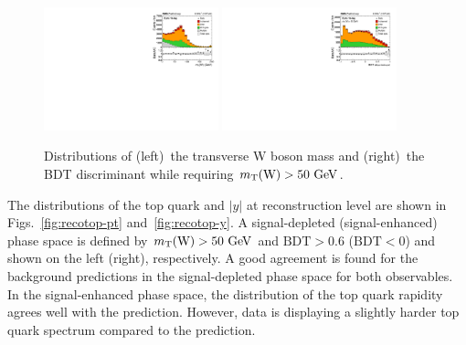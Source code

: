 \documentclass[12pt]{article}
\begin{document}
\begin{figure}[th]
\begin{center}
\includegraphics[width=0.45\textwidth]{figures/fit/reco_mtw.pdf}\hspace{0.05\textwidth}
\includegraphics[width=0.45\textwidth]{figures/fit/reco_BDT.pdf}
\end{center}

\caption{\label{fig:mtwbdt}Distributions of (left)~the transverse W boson mass and (right)~the BDT discriminant while requiring $m_{\mathrm{T}}(\mathrm{W})>50~\mathrm{GeV}$.}
\end{figure}

The distributions of the top quark \pt and $|y|$ at reconstruction level are shown in Figs.~\ref{fig:recotop-pt} and~\ref{fig:recotop-y}. A signal-depleted (signal-enhanced) phase space is defined by $m_{\mathrm{T}}(\mathrm{W})>50~\mathrm{GeV}$ and $\mathrm{BDT}>0.6$ ($\mathrm{BDT}<0$) and shown on the left (right), respectively. A good agreement is found for the background predictions in the signal-depleted phase space for both observables. In the signal-enhanced phase space, the distribution of the top quark rapidity agrees well with the prediction. However, data is displaying a slightly harder top quark \pt spectrum compared to the prediction.
\end{document}
